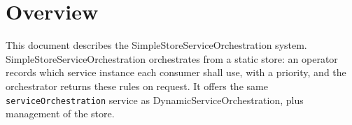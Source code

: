 \documentclass[a4paper]{arrowhead}
\begin{document}
\sloppy

\ArrowheadSetup

\begin{center}
  \vspace*{1cm}
  \huge{\arrowtitle}

  \vspace*{0.2cm}
  \LARGE{\arrowtype}
  \vspace*{1cm}

  \vspace*{\fill}


  \vspace*{1cm}
  \vspace*{\fill}

  \begin{abstract}
    This document describes the SimpleStoreServiceOrchestration core system of the Eclipse Arrowhead 5.2.2 framework, as implemented in Java Spring in \texttt{ah5-core-java-spring/serviceorchestration-simple}, including the local extensions of this workspace.
  \end{abstract}

  \vspace*{1cm}
\end{center}

\newpage

\tableofcontents
\newpage

\section{Overview}
\label{sec:overview}

This document describes the SimpleStoreServiceOrchestration system. Simple\allowbreak{}Store\allowbreak{}Service\allowbreak{}Orchestration orchestrates from a static store: an operator records which service instance each consumer shall use, with a priority, and the orchestrator returns these rules on request. It offers the same \texttt{service\allowbreak{}Orchestration} service as Dynamic\allowbreak{}Service\allowbreak{}Orchestration, plus management of the store.
\end{document}
